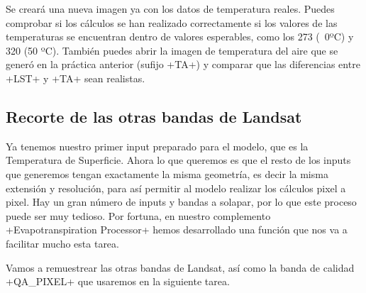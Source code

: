 \documentclass[a4paper,11pt]{article}
\begin{document}
    Se creará una nueva imagen ya con los datos de temperatura reales. Puedes comprobar si los cálculos se han realizado correctamente si los valores de las temperaturas se encuentran dentro de valores esperables, como los 273 (~0ºC) y 320 (50 ºC). También puedes abrir la imagen de temperatura del aire que se generó en la práctica anterior (sufijo \cverb+TA+) y comparar que las diferencias entre \cverb+LST+ y \cverb+TA+ sean realistas.
  
  \subsection{Recorte de las otras bandas de Landsat}
    Ya tenemos nuestro primer input preparado para el modelo, que es la Temperatura de Superficie. Ahora lo que queremos es que el resto de los inputs que generemos tengan exactamente la misma geometría, es decir la misma extensión y resolución, para así permitir al modelo realizar los cálculos pixel a pixel. Hay un gran número de inputs y bandas a solapar, por lo que este proceso puede ser muy tedioso. Por fortuna, en nuestro complemento \cverb+Evapotranspiration Processor+ hemos desarrollado una función que nos va a facilitar mucho esta tarea.
    
    Vamos a remuestrear las otras bandas de Landsat, así como la banda de calidad \cverb+QA_PIXEL+ que usaremos en la siguiente tarea.
    
\end{document}
